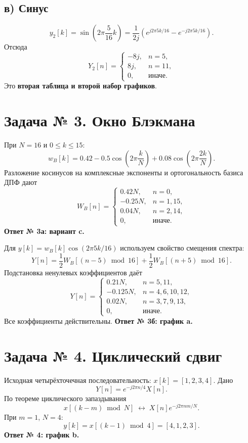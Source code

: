 \documentclass[12pt,a4paper]{article}
\begin{document}
\subsection*{в) Синус}
\[
y_2[k]=\sin\left(2\pi\frac5{16}k\right)
=\frac1{2j}\left(e^{j2\pi5k/16}-e^{-j2\pi5k/16}\right).
\]
Отсюда
\[
Y_2[n]=\begin{cases}-8j,&n=5,\\8j,&n=11,\\0,&\text{иначе}.\end{cases}
\]
Это \textbf{вторая таблица и второй набор графиков}.

\section*{Задача № 3. Окно Блэкмана}
При $N=16$ и $0\le k\le15$:
\[
w_B[k]=0.42-0.5\cos\left(2\pi\frac{k}{N}\right)
+0.08\cos\left(2\pi\frac{2k}{N}\right).
\]
Разложение косинусов на комплексные экспоненты и ортогональность базиса ДПФ дают
\[
W_B[n]=\begin{cases}
0.42N,&n=0,\\
-0.25N,&n=1,15,\\
0.04N,&n=2,14,\\
0,&\text{иначе}.
\end{cases}
\]
\textbf{Ответ № 3а: вариант c.}

Для $y[k]=w_B[k]\cos(2\pi5k/16)$ используем свойство смещения спектра:
\[
Y[n]=\frac12W_B[(n-5)\bmod16]+\frac12W_B[(n+5)\bmod16].
\]
Подстановка ненулевых коэффициентов даёт
\[
Y[n]=\begin{cases}
0.21N,&n=5,11,\\
-0.125N,&n=4,6,10,12,\\
0.02N,&n=3,7,9,13,\\
0,&\text{иначе}.
\end{cases}
\]
Все коэффициенты действительны. \textbf{Ответ № 3б: график a.}

\section*{Задача № 4. Циклический сдвиг}
Исходная четырёхточечная последовательность: $x[k]=[1,2,3,4]$.
Дано
\[
Y[n]=e^{-j2\pi n/4}X[n].
\]
По теореме циклического запаздывания
\[
x[(k-m)\bmod N]\;\longleftrightarrow\;X[n]e^{-j2\pi nm/N}.
\]
При $m=1$, $N=4$:
\[
y[k]=x[(k-1)\bmod4]=[4,1,2,3].
\]
\textbf{Ответ № 4: график b.}
\end{document}
